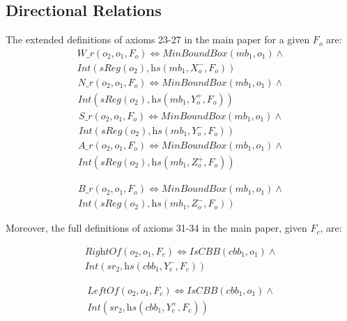 \documentclass{article}
\begin{document}
\subsection{Directional Relations }
The extended definitions of axioms 23-27 in the main paper for a given $F_o$ are:
\begin{multline}
    \textit{W\_r} (o_2,o_1,F_o) \Leftrightarrow \textit{MinBoundBox}(mb_1,o_1) \wedge \\  \textit{Int}(\textit{sReg}(o_2),\textit{hs}(mb_1,X_{o}^{-},F_o))
\end{multline}
\begin{multline}
    \textit{N\_r} (o_2,o_1,F_o) \Leftrightarrow \textit{MinBoundBox}(mb_1,o_1) \wedge \\    \textit{Int}(\textit{sReg}(o_2),\textit{hs}(mb_1,Y_{o}^{+},F_o))
\end{multline}
\begin{multline}
    \textit{S\_r} (o_2,o_1,F_o) \Leftrightarrow \textit{MinBoundBox}(mb_1,o_1) \wedge \\   \textit{Int}(\textit{sReg}(o_2),\textit{hs}(mb_1,Y_{o}^{-},F_o))
\end{multline}
\begin{multline}
    \textit{A\_r} (o_2,o_1, F_o) \Leftrightarrow \textit{MinBoundBox}(mb_1,o_1) \wedge \\  \textit{Int}(\textit{sReg}(o_2),\textit{hs}(mb_1,Z_{o}^{+},F_o))
\end{multline}
    
\begin{multline}
    \textit{B\_r} (o_2,o_1,F_o) \Leftrightarrow  \textit{MinBoundBox}(mb_1,o_1) \wedge \\  \textit{Int}(\textit{sReg}(o_2),\textit{hs}(mb_1,Z_{o}^{-},F_o))
\end{multline}

Moreover, the full definitions of axioms 31-34 in the main paper, given $F_c$, are:

\begin{multline}
  \textit{RightOf} (o_2,o_1,F_c) \Leftrightarrow  \textit{IsCBB}(cbb_1,o_1) \wedge  \\ \textit{Int}(\textit{sr}_2,
    \textit{hs}(cbb_1,Y_{c}^{-},F_c))  
\end{multline}

\begin{multline}
 \textit{LeftOf} (o_2,o_1,F_c) \Leftrightarrow \textit{IsCBB}(cbb_1,o_1) \wedge \\ \textit{Int}(\textit{sr}_2,
 \textit{hs}(cbb_1,Y_{c}^{+},F_c))   
\end{multline}
\end{document}
